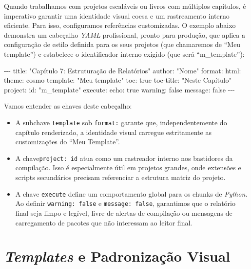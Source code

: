 \documentclass[
  brazilian,
  letterpaper,
  DIV=11,
  numbers=noendperiod]{scrreprt}
\newenvironment{Shaded}{\begin{snugshade}}{\end{snugshade}}
\newcommand{\NormalTok}[1]{\textcolor[rgb]{0.00,0.23,0.31}{#1}}
\begin{document}
Quando trabalhamos com projetos escaláveis ou livros com múltiplos
capítulos, é imperativo garantir uma identidade visual coesa e um
rastreamento interno eficiente. Para isso, configuramos referências
customizadas. O exemplo abaixo demonstra um cabeçalho \emph{YAML}
profissional, pronto para produção, que aplica a configuração de estilo
definida para os seus projetos (que chamaremos de ``Meu template'') e
estabelece o identificador interno exigido (que será ``m\_template''):

\begin{Shaded}
\begin{Highlighting}[]
\NormalTok{{-}{-}{-}}
\NormalTok{title: "Capítulo 7: Estruturação de Relatórios"}
\NormalTok{author: "Nome"}
\NormalTok{format:}
\NormalTok{  html:}
\NormalTok{    theme: cosmo}
\NormalTok{    template: "Meu template"}
\NormalTok{    toc: true}
\NormalTok{    toc{-}title: "Neste Capítulo"}
\NormalTok{project:}
\NormalTok{  id: "m\_template"}
\NormalTok{execute:}
\NormalTok{  echo: true}
\NormalTok{  warning: false}
\NormalTok{  message: false}
\NormalTok{{-}{-}{-}}
\end{Highlighting}
\end{Shaded}

Vamos entender as chaves deste cabeçalho:

\begin{itemize}
\item
  A subchave \texttt{template} sob \texttt{format:} garante que,
  independentemente do capítulo renderizado, a identidade visual
  carregue estritamente as customizações do ``Meu Template''.
\item
  A chave\texttt{project:\ id} atua como um rastreador interno nos
  bastidores da compilação. Isso é especialmente útil em projetos
  grandes, onde extensões e scripts secundários precisam referenciar a
  estrutura matriz do projeto.
\item
  A chave \texttt{execute} define um comportamento global para os chunks
  de \emph{Python.} Ao definir \texttt{warning:\ false} e
  \texttt{message:\ false}, garantimos que o relatório final seja limpo
  e legível, livre de alertas de compilação ou mensagens de carregamento
  de pacotes que não interessam ao leitor final.
\end{itemize}

\section{\texorpdfstring{\emph{Templates} e Padronização
Visual}{Templates e Padronização Visual}}\label{templates-e-padronizauxe7uxe3o-visual}
\end{document}
